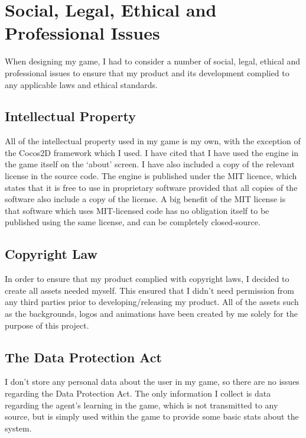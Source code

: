 \documentclass[a4paper,oneside]{report}
\begin{document}
	
\chapter{Social, Legal, Ethical and Professional Issues}

When designing my game, I had to consider a number of social, legal, ethical and professional issues to ensure that my product and its development complied to any applicable laws and ethical standards.

\section{Intellectual Property}

All of the intellectual property used in my game is my own, with the exception of the Cocos2D framework which I used. I have cited that I have used the engine in the game itself on the `about' screen. I have also included a copy of the relevant license in the source code. The engine is published under the MIT licence, which states that it is free to use in proprietary software provided that all copies of the software also include a copy of the license. A big benefit of the MIT license is that software which uses MIT-licensed code has no obligation itself to be published using the same license, and can be completely closed-source.

\section{Copyright Law}

In order to ensure that my product complied with copyright laws, I decided to create all assets needed myself. This ensured that I didn't need permission from any third parties prior to developing/releasing my product. All of the assets such as the backgrounds, logos and animations have been created by me solely for the purpose of this project.

\section{The Data Protection Act}

I don't store any personal data about the user in my game, so there are no issues regarding the Data Protection Act. The only information I collect is data regarding the agent's learning in the game, which is not transmitted to any source, but is simply used within the game to provide some basic stats about the system.
\end{document}
